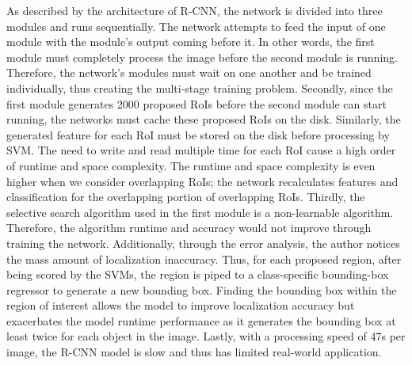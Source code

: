 As described by the architecture of R-CNN, the network is divided into three modules and runs sequentially. The network attempts to feed the input of one module with the module's output coming before it. In other words, the first module must completely process the image before the second module is running. Therefore, the network's modules must wait on one another and be trained individually, thus creating the multi-stage training problem. Secondly, since the first module generates 2000 proposed RoIs before the second module can start running, the networks must cache these proposed RoIs on the disk. Similarly, the generated feature for each RoI must be stored on the disk before processing by SVM. The need to write and read multiple time for each RoI cause a high order of runtime and space complexity. The runtime and space complexity is even higher when we consider overlapping RoIs; the network recalculates features and classification for the overlapping portion of overlapping RoIs. Thirdly, the selective search algorithm used in the first module is a non-learnable algorithm. Therefore, the algorithm runtime and accuracy would not improve through training the network. Additionally, through the error analysis, the author notices the mass amount of localization inaccuracy. Thus, for each proposed region, after being scored by the SVMs, the region is piped to a class-speciﬁc bounding-box regressor to generate a new bounding box. Finding the bounding box within the region of interest allows the model to improve localization accuracy but exacerbates the model runtime performance as it generates the bounding box at least twice for each object in the image. Lastly, with a processing speed of 47s per image, the R-CNN model is slow and thus has limited real-world application.